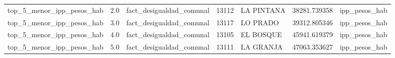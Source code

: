 \begin{table}[htbp]
\begin{tabular}{|p{3.2cm}|p{0.9cm}|p{3.0cm}|p{1.2cm}|p{2.8cm}|p{2.3cm}|p{1.8cm}|}
top\_5\_menor\_ipp\_pesos\_hab & 2.0 & fact\_desigualdad\_comunal & 13112 & LA PINTANA & 38281.739358 & ipp\_pesos\_hab \\
top\_5\_menor\_ipp\_pesos\_hab & 3.0 & fact\_desigualdad\_comunal & 13117 & LO PRADO & 39312.805346 & ipp\_pesos\_hab \\
top\_5\_menor\_ipp\_pesos\_hab & 4.0 & fact\_desigualdad\_comunal & 13105 & EL BOSQUE & 45941.619379 & ipp\_pesos\_hab \\
top\_5\_menor\_ipp\_pesos\_hab & 5.0 & fact\_desigualdad\_comunal & 13111 & LA GRANJA & 47063.353627 & ipp\_pesos\_hab \\
\hline
\end{tabular}
\end{table}
